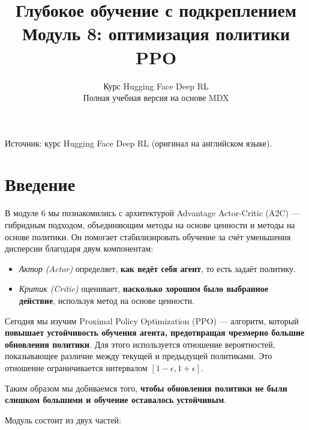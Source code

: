 \documentclass[11pt,a4paper]{article}
\title{\textbf{Глубокое обучение с подкреплением}\\[0.35em]\large Модуль 8: оптимизация политики PPO}
\author{Курс Hugging Face Deep RL\\\small Полная учебная версия на основе MDX}
\date{}
\begin{document}
\selectfont
\maketitle
\vspace{-0.8em}
\begin{center}\small\color{secondary}Источник: курс Hugging Face Deep RL (оригинал на английском языке).\end{center}
\begingroup\small\setlength{\parskip}{0pt}\tableofcontents\endgroup
\vspace{0.5em}
\clearpage

\section{Введение}\label{introduction}


В модуле 6 мы познакомились с архитектурой Advantage Actor-Critic (A2C) --- гибридным подходом, объединяющим методы на основе ценности и методы на основе политики. Он помогает стабилизировать обучение за счёт уменьшения дисперсии благодаря двум компонентам:

\begin{itemize}
\tightlist
\item
  \emph{Актор (Actor)} определяет, \textbf{как ведёт себя агент}, то есть задаёт политику.
\item
  \emph{Критик (Critic)} оценивает, \textbf{насколько хорошим было выбранное действие}, используя метод на основе ценности.
\end{itemize}

Сегодня мы изучим Proximal Policy Optimization (PPO) --- алгоритм, который \textbf{повышает устойчивость обучения агента, предотвращая чрезмерно большие обновления политики}. Для этого используется отношение вероятностей, показывающее различие между текущей и предыдущей политиками. Это отношение ограничивается интервалом \([1 - \epsilon, 1 + \epsilon]\).

Таким образом мы добиваемся того, \textbf{чтобы обновления политики не были слишком большими и обучение оставалось устойчивым}.

Модуль состоит из двух частей:
\end{document}
